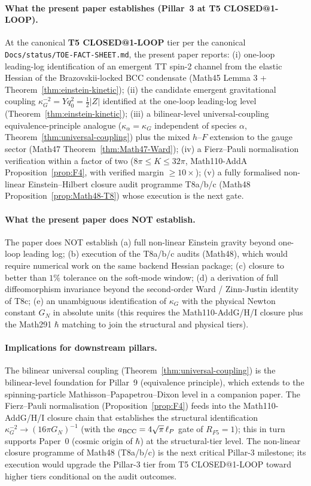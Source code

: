 \paragraph{What the present paper establishes (Pillar~3 at T5
CLOSED@1-LOOP).}
At the canonical \textbf{T5 CLOSED@1-LOOP} tier per the canonical
\texttt{Docs/status/TOE-FACT-SHEET.md}, the present paper reports:
(i) one-loop leading-log identification of an emergent TT spin-2
channel from the elastic Hessian of the Brazovskii-locked BCC
condensate (Math45 Lemma 3 + Theorem~\ref{thm:einstein-kinetic});
(ii) the candidate emergent gravitational coupling
$\kappa_G^{-2} = Y q_0^2 = \tfrac{1}{2}|Z|$ identified at the
one-loop leading-log level (Theorem~\ref{thm:einstein-kinetic});
(iii) a bilinear-level universal-coupling equivalence-principle
analogue ($\kappa_\alpha = \kappa_G$ independent of species
$\alpha$, Theorem~\ref{thm:universal-coupling}) plus the mixed
$h$--$F$ extension to the gauge sector (Math47
Theorem~\ref{thm:Math47-Ward}); (iv) a Fierz--Pauli normalisation
verification within a factor of two ($8\pi \leq K \leq 32\pi$,
Math110-AddA Proposition~\ref{prop:F4}, with verified margin
$\geq 10\times$); (v) a fully formalised non-linear
Einstein--Hilbert closure audit programme T8a/b/c
(Math48 Proposition~\ref{prop:Math48-T8}) whose execution is the
next gate.

\paragraph{What the present paper does NOT establish.}
The paper does NOT establish (a) full non-linear Einstein gravity
beyond one-loop leading log; (b) execution of the T8a/b/c audits
(Math48), which would require numerical work on the same backend
Hessian package; (c) closure to better than $1\%$ tolerance on the
soft-mode window; (d) a derivation of full diffeomorphism
invariance beyond the second-order Ward / Zinn-Justin identity of
T8c; (e) an unambiguous identification of $\kappa_G$ with the
physical Newton constant $G_N$ in absolute units (this requires
the Math110-AddG/H/I closure plus the Math291 $\hbar$ matching to
join the structural and physical tiers).

\paragraph{Implications for downstream pillars.}
The bilinear universal coupling
(Theorem~\ref{thm:universal-coupling}) is the bilinear-level
foundation for Pillar~9 (equivalence principle), which extends to
the spinning-particle Mathisson--Papapetrou--Dixon level in a
companion paper. The Fierz--Pauli normalisation
(Proposition~\ref{prop:F4}) feeds into the Math110-AddG/H/I closure
chain that establishes the structural identification
$\kappa_G^{-2} \to (16 \pi G_N)^{-1}$ (with the $a_{\rm BCC} = 4
\sqrt{\pi}\, \ell_P$ gate of $R_{F5} = 1$); this in turn supports
Paper~0 (cosmic origin of $\hbar$) at the structural-tier level. The
non-linear closure programme of Math48 (T8a/b/c) is the next
critical Pillar-3 milestone; its execution would upgrade the
Pillar-3 tier from T5 CLOSED@1-LOOP toward higher tiers conditional
on the audit outcomes.

